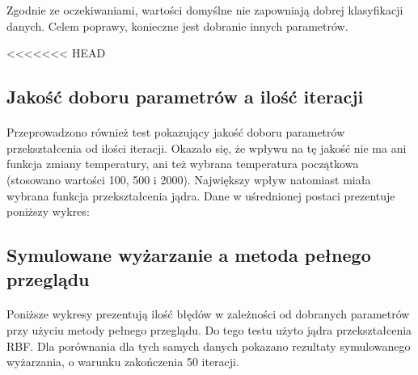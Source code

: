 \documentclass{article}
\begin{document}
Zgodnie ze oczekiwaniami, wartości domyślne nie zapowniają dobrej klasyfikacji danych. Celem poprawy, konieczne jest dobranie innych parametrów.

<<<<<<< HEAD
\subsection{Jakość doboru parametrów a ilość iteracji}
\paragraph{}
Przeprowadzono również test pokazujący jakość doboru parametrów przekształcenia od ilości iteracji. Okazało się, że wpływu na tę jakość nie ma ani funkcja zmiany temperatury, ani też wybrana temperatura początkowa (stosowano wartości 100, 500 i 2000). Największy wpływ natomiast miała wybrana funkcja przekształcenia jądra. Dane w uśrednionej postaci prezentuje poniższy wykres:

\pgfplotsset{width=7cm,compat=1.4}
\begin{center}
\end{center}

\subsection{Symulowane wyżarzanie a metoda pełnego przeglądu}
\paragraph{}
Poniższe wykresy prezentują ilość błędów w zależności od dobranych parametrów przy użyciu metody pełnego  przeglądu. Do tego testu użyto jądra przekształcenia RBF. Dla porównania dla tych samych danych pokazano rezultaty symulowanego wyżarzania, o warunku zakończenia 50 iteracji.
\end{document}
